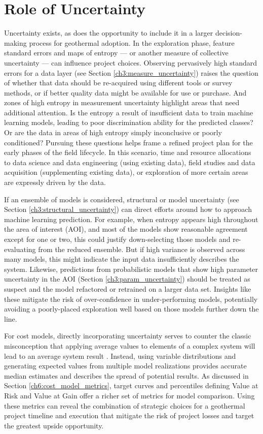 \section{Role of Uncertainty}
\label{ch7:uncertainty_role}

Uncertainty exists, as does the opportunity to include it in a larger decision-making process for geothermal adoption. In the exploration phase, feature standard errors and maps of entropy --- or another measure of collective uncertainty --- can influence project choices. Observing pervasively high standard errors for a data layer (see Section \ref{ch3:measure_uncertainty}) raises the question of whether that data should be re-acquired using different tools or survey methods, or if better quality data might be available for use or purchase. And zones of high entropy in measurement uncertainty highlight areas that need additional attention. Is the entropy a result of insufficient data to train machine learning models, leading to poor discrimination ability for the predicted classes? Or are the data in areas of high entropy simply inconclusive or poorly conditioned? Pursuing these questions helps frame a refined project plan for the early phases of the field lifecycle. In this scenario, time and resource allocations to data science and data engineering (using existing data), field studies and data acquisition (supplementing existing data), or exploration of more certain areas are expressly driven by the data.

If an ensemble of models is considered, structural or model uncertainty (see Section \ref{ch3:structural_uncertainty}) can direct efforts around how to approach machine learning prediction. For example, when entropy appears high throughout the area of interest (AOI), and most of the models show reasonable agreement except for one or two, this could justify down-selecting those models and re-evaluating from the reduced ensemble. But if high variance is observed across many models, this might indicate the input data insufficiently describes the system. Likewise, predictions from probabilistic models that show high parameter uncertainty in the AOI (Section \ref{ch3:param_uncertainty}) should be treated as suspect and the model refactored or retrained on a larger data set. Insights like these mitigate the risk of over-confidence in under-performing models, potentially avoiding a poorly-placed exploration well based on those models further down the line.

For cost models, directly incorporating uncertainty serves to counter the classic misconception that applying average values to elements of a complex system will lead to an average system result \citep[Flaw of Averages,][p.\ 17-19]{de_neufville_flexibility_2011}. Instead, using variable distributions and generating expected values from multiple model realizations provides accurate median estimates and describes the spread of potential results. As discussed in Section \ref{ch6:cost_model_metrics}, target curves and percentiles defining Value at Risk and Value at Gain offer a richer set of metrics for model comparison. Using these metrics can reveal the combination of strategic choices for a geothermal project timeline and execution that mitigate the risk of project losses and target the greatest upside opportunity.

